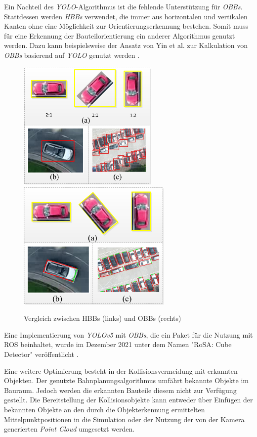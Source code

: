 Ein Nachteil des \textit{\ac{YOLO}}-Algorithmus ist die fehlende Unterstützung für \textit{\ac{OBBs}}. Stattdessen werden \textit{\ac{HBBs}} verwendet, die immer aus horizontalen und vertikalen Kanten ohne eine Möglichkeit zur Orientierungserkennung bestehen. Somit muss für eine Erkennung der Bauteilorientierung ein anderer Algorithmus genutzt werden. Dazu kann beispielsweise der Ansatz von Yin et al. zur Kalkulation von \textit{\ac{OBBs}} basierend auf \textit{\ac{YOLO}} genutzt werden  \cite{yin_fast_2018}.

\begin{figure}[ht]
    \centering
    \includegraphics[height=6.29cm]{Bilder/yolo_hbb.png}
    \includegraphics[height=6.29cm]{Bilder/yolo_obb.png}
    \caption{Vergleich zwischen HBBs (links) und OBBs (rechts) \cite{yin_fast_2018}}
    \label{fig:yolo_hbb_obb}
\end{figure}

Eine Implementierung von \textit{YOLOv5} mit \textit{\ac{OBBs}}, die ein Paket für die Nutzung mit \ac{ROS} beinhaltet, wurde im Dezember 2021 unter dem Namen "RoSA: Cube Detector" veröffentlicht \cite{hempel_rosa_2021}.

Eine weitere Optimierung besteht in der Kollisionsvermeidung mit erkannten Objekten. Der genutzte Bahnplanungsalgorithmus umfährt bekannte Objekte im Bauraum. Jedoch werden die erkannten Bauteile diesem nicht zur Verfügung gestellt. Die Bereitstellung der Kollisionsobjekte kann entweder über Einfügen der bekannten Objekte an den durch die Objekterkennung ermittelten Mittelpunktpositionen in die Simulation oder der Nutzung der von der Kamera generierten \textit{Point Cloud} umgesetzt werden.